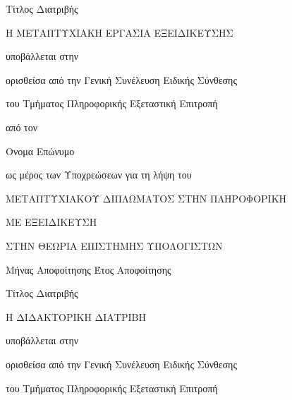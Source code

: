 \documentclass{mythesis}
\theoremstyle{plain}   %
\theoremstyle{plain}   %
\theoremstyle{plain}   %
\theoremstyle{plain}   %
\theoremstyle{definition}  %
\theoremstyle{definition}  %
\theoremstyle{plain}  %
\begin{document}
\begin{titlepage}
\begin{center}
\vspace*{0.5in} {\LARGE Τίτλος Διατριβής}
\par
\vspace{1in} {\Large Η
 ΜΕΤΑΠΤΥΧΙΑΚΗ ΕΡΓΑΣΙΑ ΕΞΕΙΔΙΚΕΥΣΗΣ}

\vspace{0.5in} {\Large υποβάλλεται στην}

\vspace{0.2in} {\Large ορισθείσα από την Γενική Συνέλευση Ειδικής
Σύνθεσης}

\vspace{0.2in} {\Large του Τμήματος Πληροφορικής Εξεταστική
Επιτροπή}

\vspace{0.5in} {\Large από τον }

\vspace{0.7in} {\LARGE Ονομα Επώνυμο}

\vspace{0.5in} {\Large ως μέρος των Υποχρεώσεων για τη λήψη του}

\vspace{0.7in} {\Large ΜΕΤΑΠΤΥΧΙΑΚΟΥ ΔΙΠΛΩΜΑΤΟΣ ΣΤΗΝ ΠΛΗΡΟΦΟΡΙΚΗ}

\vspace{0.2in} {\Large ΜΕ ΕΞΕΙΔΙΚΕΥΣΗ}

\vspace{0.2in} {\Large ΣΤΗΝ ΘΕΩΡΙΑ ΕΠΙΣΤΗΜΗΣ ΥΠΟΛΟΓΙΣΤΩΝ }
\par
\vspace{1.4in} {\Large Μήνας Αποφοίτησης Έτος Αποφοίτησης}
\par\vspace{0.6in}
\end{center}


\newpage
\thispagestyle{empty}
\begin{center}
\vspace*{0.5in} {\LARGE Τίτλος Διατριβής}
\par
\vspace{1in} {\Large Η ΔΙΔΑΚΤΟΡΙΚΗ ΔΙΑΤΡΙΒΗ}

\vspace{0.5in} {\Large υποβάλλεται στην}

\vspace{0.2in} {\Large ορισθείσα από την Γενική Συνέλευση Ειδικής
Σύνθεσης}

\vspace{0.2in} {\Large του Τμήματος Πληροφορικής Εξεταστική
Επιτροπή}


\end{center}
\end{titlepage}
\end{document}

